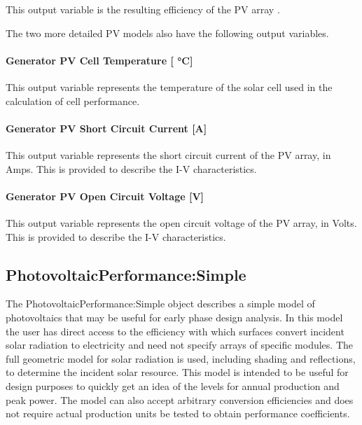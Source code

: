 This output variable is the resulting efficiency of the PV array .

The two more detailed PV models also have the following output variables.

\paragraph{Generator PV Cell Temperature {[} °C{]}}\label{generator-pv-cell-temperature-c}

This output variable represents the temperature of the solar cell used in the calculation of cell performance.

\paragraph{Generator PV Short Circuit Current {[}A{]}}\label{generator-pv-short-circuit-current-a}

This output variable represents the short circuit current of the PV array, in Amps. This is provided to describe the I-V characteristics.

\paragraph{Generator PV Open Circuit Voltage {[}V{]}}\label{generator-pv-open-circuit-voltage-v}

This output variable represents the open circuit voltage of the PV array, in Volts. This is provided to describe the I-V characteristics.

\subsection{PhotovoltaicPerformance:Simple}\label{photovoltaicperformancesimple}

The PhotovoltaicPerformance:Simple object describes a simple model of photovoltaics that may be useful for early phase design analysis. In this model the user has direct access to the efficiency with which surfaces convert incident solar radiation to electricity and need not specify arrays of specific modules. The full geometric model for solar radiation is used, including shading and reflections, to determine the incident solar resource. This model is intended to be useful for design purposes to quickly get an idea of the levels for annual production and peak power. The model can also accept arbitrary conversion efficiencies and does not require actual production units be tested to obtain performance coefficients.

